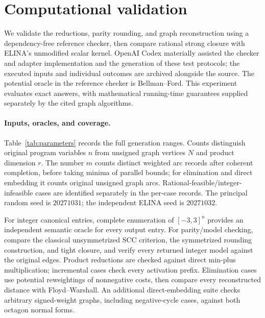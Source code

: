\documentclass[manuscript,11pt,screen,nonacm]{acmart}
\theoremstyle{definition}
\begin{document}
\section{Computational validation}\label{sec:validation}
We validate the reductions, parity rounding, and graph reconstruction using a dependency-free reference checker, then compare rational strong closure with ELINA's unmodified scalar kernel. OpenAI Codex materially assisted the checker and adapter implementation and the generation of these test protocols; the executed inputs and individual outcomes are archived alongside the source. The potential oracle in the reference checker is Bellman--Ford. This experiment evaluates exact answers, with mathematical running-time guarantees supplied separately by the cited graph algorithms.

\paragraph{Inputs, oracles, and coverage.}
Table~\ref{tab:parameters} records the full generation ranges. Counts distinguish original program variables $n$ from unsigned graph vertices $N$ and product dimension $r$. The number $m$ counts distinct weighted arc records after coherent completion, before taking minima of parallel bounds; for elimination and direct embedding it counts original unsigned graph arcs. Rational-feasible/integer-infeasible cases are identified separately in the per-case records. The principal random seed is $20271031$; the independent ELINA seed is $20271032$.

For integer canonical entries, complete enumeration of $[-3,3]^n$ provides an independent semantic oracle for every output entry. For parity/model checking, compare the classical unsymmetrized SCC criterion, the symmetrized rounding construction, and tight closure, and verify every returned integer model against the original edges. Product reductions are checked against direct min-plus multiplication; incremental cases check every activation prefix. Elimination cases use potential reweightings of nonnegative costs, then compare every reconstructed distance with Floyd--Warshall. An additional direct-embedding suite checks arbitrary signed-weight graphs, including negative-cycle cases, against both octagon normal forms.

\begin{table}[H]
\caption{Executed test coverage and generation parameters. F/I counts are feasible/infeasible cases for the indicated semantics; counts for both rational and integer semantics and observed arc-count distributions are generated from the logs in the artifact. Bounds specify generation ranges, not extrapolated measurements.}
\label{tab:parameters}

\end{table}
\end{document}
